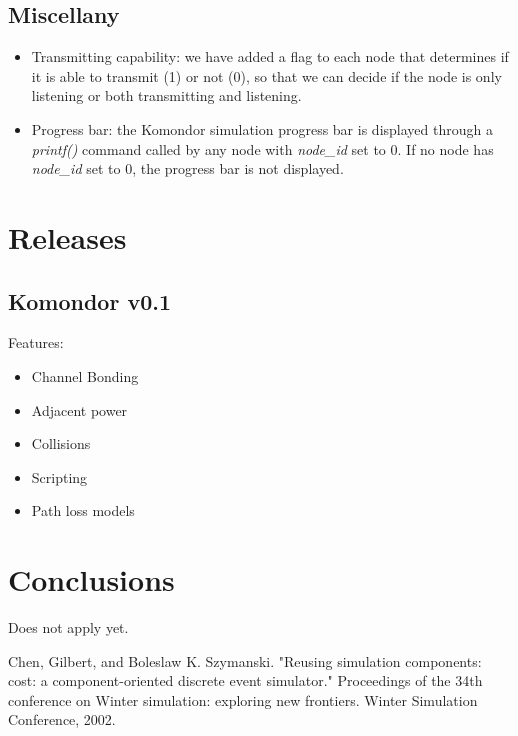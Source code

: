 \documentclass[a4paper]{article}
\begin{document}
\subsection{Miscellany}
\begin{itemize}
\item Transmitting capability: we have added a flag to each node that determines if it is able to transmit (1) or not (0), so that we can decide if the node is only listening or both transmitting and listening.
\item Progress bar: the Komondor simulation progress bar is displayed through a \textit{printf()} command called by any node with \textit{node\_id} set to 0. If no node has \textit{node\_id} set to 0, the progress bar is not displayed.
\end{itemize}

\section{Releases}

\subsection{Komondor v0.1}
Features:
\begin{itemize}
\item Channel Bonding
\item Adjacent power
\item Collisions
\item Scripting
\item Path loss models
\end{itemize}


\section{Conclusions}
Does not apply yet.


\begin{thebibliography}{1}

Chen, Gilbert, and Boleslaw K. Szymanski. "Reusing simulation components: cost: a component-oriented discrete event simulator."
Proceedings of the 34th conference on Winter simulation: exploring new frontiers. Winter Simulation Conference, 2002.

\end{thebibliography}
\end{document}
